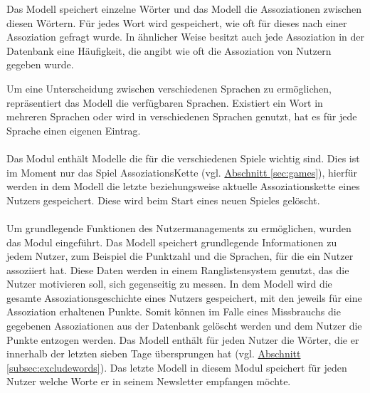 Das Modell  speichert einzelne Wörter und das Modell  die Assoziationen zwischen diesen Wörtern. Für jedes Wort wird gespeichert, wie oft für dieses nach einer Assoziation gefragt wurde. In ähnlicher Weise besitzt auch jede Assoziation in der Datenbank eine Häufigkeit, die angibt wie oft die Assoziation von Nutzern gegeben wurde.

Um eine Unterscheidung zwischen verschiedenen Sprachen zu ermöglichen, repräsentiert das Modell  die verfügbaren Sprachen. Existiert ein Wort in mehreren Sprachen oder wird in verschiedenen Sprachen genutzt, hat es für jede Sprache einen eigenen Eintrag.

\paragraph{} Das Modul  enthält Modelle die für die verschiedenen Spiele wichtig sind. Dies ist im Moment nur das Spiel AssoziationsKette (vgl. \hyperref[sec:games]{Abschnitt \ref*{sec:games}}), hierfür werden in dem Modell  die letzte beziehungsweise aktuelle Assoziationskette eines Nutzers gespeichert. Diese wird beim Start eines neuen Spieles gelöscht.

\paragraph{} Um grundlegende Funktionen des Nutzermanagements zu ermöglichen, wurden das Modul  eingeführt. Das Modell  speichert grundlegende Informationen zu jedem Nutzer, zum Beispiel die Punktzahl und die Sprachen, für die ein Nutzer assoziiert hat. Diese Daten werden in einem Ranglistensystem genutzt, das die Nutzer motivieren soll, sich gegenseitig zu messen. In dem Modell  wird die gesamte Assoziationsgeschichte eines Nutzers gespeichert, mit den jeweils für eine Assoziation erhaltenen Punkte. Somit können im Falle eines Missbrauchs die gegebenen Assoziationen aus der Datenbank gelöscht werden und dem Nutzer die Punkte entzogen werden.
Das Modell  enthält für jeden Nutzer die Wörter, die er innerhalb der letzten sieben Tage übersprungen hat (vgl. \hyperref[subsec:excludewords]{Abschnitt \ref*{subsec:excludewords}}). Das letzte Modell in diesem Modul speichert für jeden Nutzer welche Worte er in seinem Newsletter empfangen möchte.

